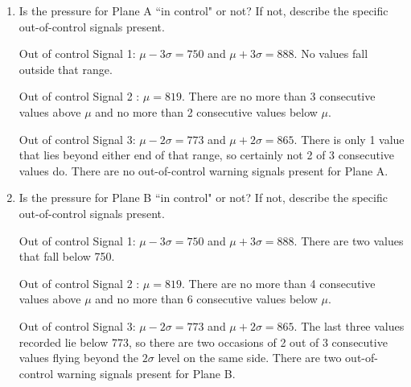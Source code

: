 \documentclass{article}
\newcommand{\answer}[1]{\color{red}#1}
\begin{document}
\begin{enumerate}
	\begin{enumerate}
	\item  Is the pressure for Plane A ``in control" or not?  If not, describe the specific out-of-control signals present. 
	
	{\answer Out of control Signal 1: $\mu -3\sigma = 750$ and $\mu +3\sigma = 888$.  No values fall outside that range. 
	
	Out of control Signal 2 : $\mu = 819$.  There are no more than 3 consecutive values above $\mu$ and no more than 2 consecutive values below $\mu$.
	
	Out of control Signal 3: $\mu -2\sigma = 773$ and $\mu +2\sigma = 865$.  There is only 1 value that lies beyond either end of that range, so certainly not 2 of 3 consecutive values do. There are no out-of-control warning signals present for Plane A.} 
	
	\item  Is the pressure for Plane B ``in control" or not?  If not, describe the specific out-of-control signals present.
	
	{\answer Out of control Signal 1: $\mu -3\sigma = 750$ and $\mu +3\sigma = 888$.  There are two values that fall below 750. 
	
	Out of control Signal 2 : $\mu = 819$.  There are no more than 4 consecutive values above $\mu$ and no more than 6 consecutive values below $\mu$. 
	
	Out of control Signal 3: $\mu -2\sigma = 773$ and $\mu +2\sigma = 865$.  The last three values recorded lie below 773, so there are two occasions of 2 out of 3 consecutive values flying beyond the $2\sigma$ level on the same side. There are two out-of-control warning signals present for Plane B.} 
	\end{enumerate}
	
	
\end{enumerate}

\vfill
\end{document}
